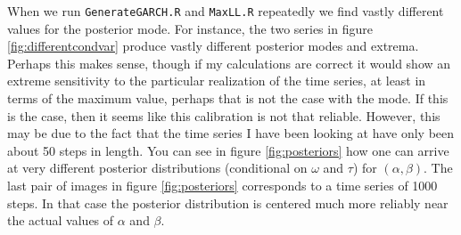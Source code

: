 \documentclass{article}
\begin{document}
\begin{description}
When we run \texttt{GenerateGARCH.R} and \texttt{MaxLL.R} repeatedly we find vastly different values for the posterior mode.  For instance, the two series in figure \ref{fig:differentcondvar} produce vastly different posterior modes and extrema.  Perhaps this makes sense, though if my calculations are correct it would show an extreme sensitivity to the particular realization of the time series, at least in terms of the maximum value, perhaps that is not the case with the mode.  If this is the case, then it seems like this calibration is not that reliable.  However, this may be due to the fact that the time series I have been looking at have only been about 50 steps in length.  You can see in figure \ref{fig:posteriors} how one can arrive at very different posterior distributions (conditional on $\omega$ and $\tau$) for $(\alpha, \beta)$.  The last pair of images in figure \ref{fig:posteriors} corresponds to a time series of 1000 steps.  In that case the posterior distribution is centered much more reliably near the actual values of $\alpha$ and $\beta$.

\begin{comment}
\begin{figure}[!h]
\begin{center}
\texttt{[image: ../Images/condvar.jpg]}
\end{center}
\caption{Two different conditional variance time series.  The red series produces a maximum (of the negative log likelihood) of 70.  The blue series prodcuces a maximum of -17.}
\label{fig:differentcondvar}
\end{figure}

\begin{figure}[!h]
\begin{center}
\texttt{[image: ../Images/garch01.jpg]}
\texttt{[image: ../Images/post01.jpg]}

\texttt{[image: ../Images/garch02.jpg]}
\texttt{[image: ../Images/post02.jpg]}

\texttt{[image: ../Images/garch03.jpg]}
\texttt{[image: ../Images/post03.jpg]}

\texttt{[image: ../Images/garch04.jpg]}
\texttt{[image: ../Images/post04.jpg]}

\end{center}
\caption{Each pair of images is a time series and a posterior distribution for $\theta = (\alpha, \beta, \omega^*)$ where we have fixed $\omega^*$ to be the value of $\omega$ at the posterior mode.  Thus these are joint posterior distributions in $(\alpha, \beta)$ conditioned on $\omega = \omega^*$ and $\tau = 1$.  The first three pairs correspond to time series with 50 steps.  The last pair corresponds to a time series with 1000 steps.  The true values of our parameters are $\alpha = 2.0, \; \beta = 6.0, \; \omega = 1.0$.  We have fixed $\tau = 1$.}
\label{fig:posteriors}
\end{figure}
\end{comment}


\end{description}
\end{document}

